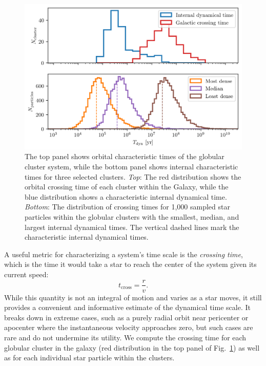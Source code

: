         \begin{figure}
            \centering
            \includegraphics[width=\linewidth]{images/GCsystemCharacteristicTimes.png}
            \caption[Distributions of various dynamical times]{The top panel shows orbital characteristic times of the globular cluster system, while the bottom panel shows internal characteristic times for three selected clusters. \textit{Top}: The red distribution shows the orbital crossing time of each cluster within the Galaxy, while the blue distribution shows a characteristic internal dynamical time. \textit{Bottom}: The distribution of crossing times for 1,000 sampled star particles within the globular clusters with the smallest, median, and largest internal dynamical times. The vertical dashed lines mark the characteristic internal dynamical times.}
            \label{fig:GCsystemCharacteristicTimes}
        \end{figure}

        A useful metric for characterizing a system's time scale is the \textit{crossing time}, which is the time it would take a star to reach the center of the system given its current speed:
        \begin{equation}
            t_\mathrm{cross} = \frac{r}{v}.
        \end{equation}
        While this quantity is not an integral of motion and varies as a star moves, it still provides a convenient and informative estimate of the dynamical time scale. It breaks down in extreme cases, such as a purely radial orbit near pericenter or apocenter where the instantaneous velocity approaches zero, but such cases are rare and do not undermine its utility. We compute the crossing time for each globular cluster in the galaxy (red distribution in the top panel of Fig.~\ref{fig:GCsystemCharacteristicTimes}) as well as for each individual star particle within the clusters.


